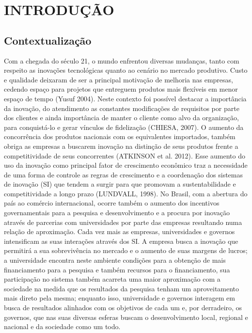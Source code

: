 \chapter{INTRODUÇÃO}
\thispagestyle{empty}

\section{Contextualização}
Com a chegada do século 21, o mundo enfrentou diversas mudanças, tanto com respeito as inovações tecnológicas quanto ao cenário no mercado produtivo. Custo e qualidade deixaram de ser a principal motivação de melhoria nas empresas, cedendo espaço para projetos que entreguem produtos mais flexíveis em menor espaço de tempo (Yusuf 2004). Neste contexto foi possível destacar a importância da inovação, do atendimento as constantes modificações de requisitos por parte dos clientes e ainda importância de manter o cliente como alvo da organização, para conquistá-lo e gerar vínculos de fidelização (CHIESA, 2007).
O aumento da concorrência dos produtos nacionais com os equivalentes importados, também obriga as empresas a buscarem inovação na distinção de seus produtos frente a competitividade de seus concorrentes (ATKINSON et al. 2012).
Esse aumento do uso da inovação como principal fator de crescimento econômico traz a necessidade de uma forma de controle as regras de crescimento e a coordenação dos sistemas de inovação (SI) que tendem a surgir para que promovam a sustentabilidade e competitividade a longo prazo (LUNDVALL, 1998).
No Brasil, com a abertura do país ao comércio internacional, ocorre também o aumento dos incentivos governamentais para a pesquisa e desenvolvimento e a procura por inovação através de parcerias com universidades por parte das empresas resultando numa relação de aproximação. Cada vez mais as empresas, universidades e governos intensificam as suas interações através dos SI.
A empresa busca a inovação que permitirá a sua sobrevivência no mercado e o aumento de suas margens de lucros; a universidade encontra neste ambiente condições para a obtenção de mais financiamento para a pesquisa e também recursos para o financiamento, sua participação no sistema também acarreta uma maior aproximação com a sociedade na medida que os resultados da pesquisa tenham um aproveitamento mais direto pela mesma; enquanto isso, universidade e governos interagem em busca de resultados alinhados com os objetivos de cada um e, por derradeiro, os governos, que nas suas diversas esferas buscam o desenvolvimento local, regional e nacional e da sociedade como um todo.
